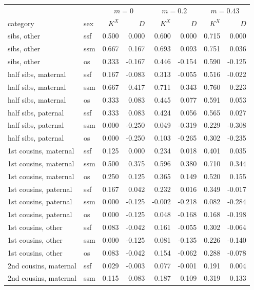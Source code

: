 \begin{tabular}{ll|rr|rr|rr}\toprule
 & & \multicolumn{2}{c|}{$m=0$} & \multicolumn{2}{c|}{$m=0.2$} & \multicolumn{2}{c}{$m=0.43$}\\
category & sex & $K^X$ & $D$ & $K^X$ & $D$ & $K^X$ & $D$\\\midrule
sibs, other & ssf & 0.500 & 0.000 & 0.600 & 0.000 & 0.715 & 0.000 \\
sibs, other & ssm & 0.667 & 0.167 & 0.693 & 0.093 & 0.751 & 0.036 \\
sibs, other & os & 0.333 & -0.167 & 0.446 & -0.154 & 0.590 & -0.125 \\
half sibs, maternal & ssf & 0.167 & -0.083 & 0.313 & -0.055 & 0.516 & -0.022 \\
half sibs, maternal & ssm & 0.667 & 0.417 & 0.711 & 0.343 & 0.760 & 0.223 \\
half sibs, maternal & os & 0.333 & 0.083 & 0.445 & 0.077 & 0.591 & 0.053 \\
half sibs, paternal & ssf & 0.333 & 0.083 & 0.424 & 0.056 & 0.565 & 0.027 \\
half sibs, paternal & ssm & 0.000 & -0.250 & 0.049 & -0.319 & 0.229 & -0.308 \\
half sibs, paternal & os & 0.000 & -0.250 & 0.103 & -0.265 & 0.302 & -0.235 \\
1st cousins, maternal & ssf & 0.125 & 0.000 & 0.234 & 0.018 & 0.401 & 0.035 \\
1st cousins, maternal & ssm & 0.500 & 0.375 & 0.596 & 0.380 & 0.710 & 0.344 \\
1st cousins, maternal & os & 0.250 & 0.125 & 0.365 & 0.149 & 0.520 & 0.155 \\
1st cousins, paternal & ssf & 0.167 & 0.042 & 0.232 & 0.016 & 0.349 & -0.017 \\
1st cousins, paternal & ssm & 0.000 & -0.125 & -0.002 & -0.218 & 0.082 & -0.284 \\
1st cousins, paternal & os & 0.000 & -0.125 & 0.048 & -0.168 & 0.168 & -0.198 \\
1st cousins, other & ssf & 0.083 & -0.042 & 0.161 & -0.055 & 0.302 & -0.064 \\
1st cousins, other & ssm & 0.000 & -0.125 & 0.081 & -0.135 & 0.226 & -0.140 \\
1st cousins, other & os & 0.083 & -0.042 & 0.154 & -0.062 & 0.288 & -0.078 \\
2nd cousins, maternal & ssf & 0.029 & -0.003 & 0.077 & -0.001 & 0.191 & 0.004 \\
2nd cousins, maternal & ssm & 0.115 & 0.083 & 0.187 & 0.109 & 0.319 & 0.133 \\

\end{tabular}
